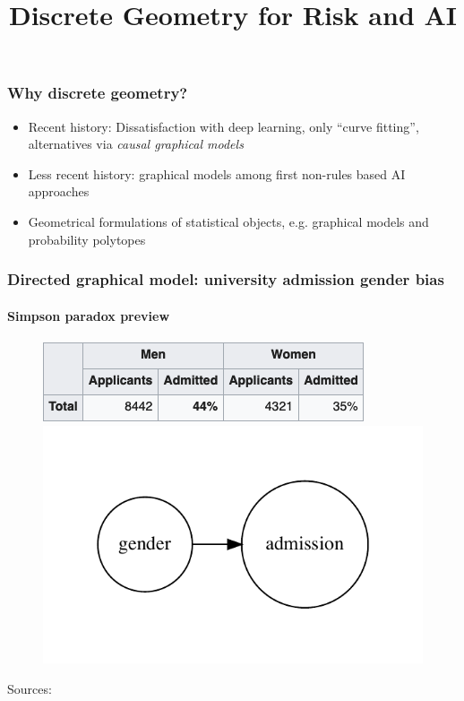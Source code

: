 


\title{Discrete Geometry for Risk and AI}

\maketitle


\begin{frame}
\frametitle{Why discrete geometry?}

\begin{itemize}
\item Recent history: Dissatisfaction with deep learning, only ``curve fitting'', alternatives via \emph{causal graphical models} \cite{pearl2019limitations}
\item Less recent history: graphical models among first non-rules based AI approaches \cite{darwiche2009modeling}
\item Geometrical formulations of statistical objects, e.g. graphical models and probability polytopes\newline
\end{itemize}

\end{frame}


\begin{frame}
  \frametitle{Directed graphical model: university admission gender bias}
  \framesubtitle{Simpson paradox preview}

  \begin{figure}[ht]
    \centering
            \includegraphics[height=0.15\textwidth]{graphics/berkeley} 
            \includegraphics[height=0.4\textwidth]{graphics/admission_original}
       
    \end{figure}
    Sources: \cite{simpson-wikipedia} \cite{freedman1998statistics}
\end{frame}

